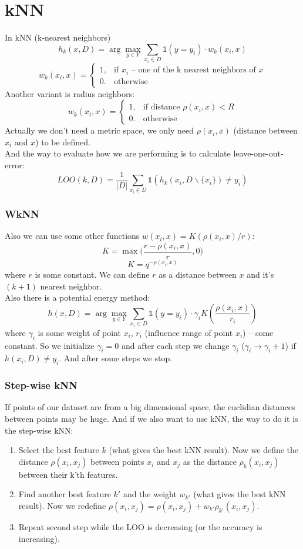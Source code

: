\section{kNN}

In kNN (k-nearest neighbors)
$$h_k(x, D)=\arg\max\limits_{y\in Y}\sum\limits_{x_i\in D}\mathbb{1}(y=y_i)\cdot w_k(x_i,x)$$
$$w_k(x_i,x)=\begin{cases}
	1, & \text{if $x_i$ -- one of the k nearest neighbors of $x$} \\
	0. & \text{otherwise}
\end{cases}
$$
Another variant is radius neighbors:
$$w_k(x_i,x)=\begin{cases}
	1, & \text{if distance $\rho(x_i,x)<R$} \\
	0. & \text{otherwise}
\end{cases}
$$
Actually we don't need a metric space, we only need $\rho(x_i, x)$ (distance between $x_i$ and $x$) to be defined. \\
And the way to evaluate how we are performing is to calculate leave-one-out-error:
$$LOO(k,D)=\frac{1}{|D|}\sum\limits_{x_i\in D}\mathbb{1}(h_k(x_i,D\backslash\{x_i\})\ne y_i)$$

\subsubsection*{WkNN}

Also we can use some other functions $w(x_i,x)=K(\rho(x_i,x)/r)$:
$$K=\max\Big(\frac{r-\rho(x_i,x)}{r}, 0\Big)$$
$$K=q^{-\rho(x_i,x)}$$
where $r$ is some constant. We can define $r$ as a distance between $x$ and it's $(k+1)$ nearest neighbor.\\
Also there is a potential energy method:
$$h(x, D)=\arg\max\limits_{y\in Y}\sum\limits_{x_i\in D}\mathbb{1}(y=y_i)\cdot\gamma_i K\left(\frac{\rho(x_i,x)}{r_i}\right)$$
where $\gamma_i$ is some weight of point $x_i$, $r_i$ (influence range of point $x_i$) -- some constant. So we initialize $\gamma_i=0$ and after each step we change $\gamma_i$ ($\gamma_i\to\gamma_i+1$) if $h(x_i, D)\ne y_i$. And after some steps we stop.

\subsubsection*{Step-wise kNN}

If points of our dataset are from a big dimensional space, the euclidian distances between points may be huge. And if we also want to use kNN, the way to do it is the step-wise kNN:
\begin{enumerate}
	\item Select the best feature $k$ (what gives the best kNN result). Now we define the distance $\rho(x_i, x_j)$ between points $x_i$ and $x_j$ as the distance $\rho_k(x_i,x_j)$ between their k'th features.
	\item Find another best feature $k'$ and the weight $w_{k'}$ (what gives the best kNN result). Now we redefine $\rho(x_i,x_j)=\rho(x_i,x_j)+w_{k'}\rho_{k'}(x_i,x_j)$.
	\item Repeat second step while the LOO is decreasing (or the accuracy is increasing).
\end{enumerate}